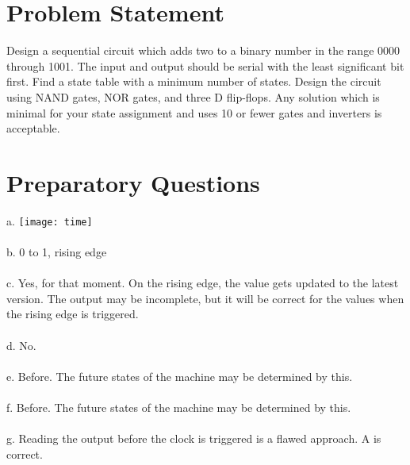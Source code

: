 \documentclass{report}
\begin{document}

\section{Problem Statement}
Design a sequential circuit which adds two to a binary number in the
range 0000 through 1001. The input and output should be serial with the
least significant bit first. Find a state table with a minimum number of
states. Design the circuit using NAND gates, NOR gates, and three D
flip-flops. Any solution which is minimal for your state assignment and
uses 10 or fewer gates and inverters is acceptable.

\section {Preparatory Questions}
a. 
\texttt{[image: time]}
\\\\
b. 0 to 1, rising edge
\\\\
c. Yes, for that moment. On the rising edge, the value gets updated to the
latest version. The output may be incomplete, but it will be correct for the
values when the rising edge is triggered.
\\\\
d. No.
\\\\
e. Before. The future states of the machine may be determined by this.
\\\\
f. Before. The future states of the machine may be determined by this.
\\\\
g. Reading the output before the clock is triggered is a flawed approach. A is correct.
\end{document}
